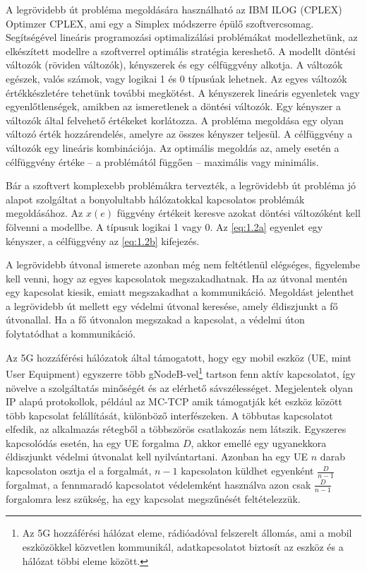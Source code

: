 \documentclass[a4paper,oneside]{article}
\begin{document}
A legrövidebb út probléma megoldására használható az IBM ILOG (CPLEX) Optimzer CPLEX,
ami egy a Simplex módszerre épülő szoftvercsomag.
Segítségével lineáris programozási optimalizálási \linebreak problémákat modellezhetünk,
az elkészített modellre a szoftverrel optimális stratégia kereshető.
A modellt döntési változók (röviden változók), kényszerek és egy célfüggvény alkotja.
A változók egészek, valós számok, vagy logikai 1 és 0 típusúak lehetnek.
Az egyes változók értékkészletére tehetünk további megkötést.
A kényszerek lineáris egyenletek vagy egyenlőtlenségek, amikben az ismeretlenek a döntési változók.
Egy kényszer a változók által felvehető értékeket korlátozza.
A probléma megoldása egy olyan változó érték hozzárendelés, amelyre az összes kényszer teljesül.
A célfüggvény a változók egy lineáris kombinációja.
Az optimális megoldás az, amely esetén a célfüggvény értéke
-- a problémától függően --  maximális vagy minimális.

Bár a szoftvert komplexebb problémákra tervezték, a legrövidebb út probléma jó
alapot szolgáltat a bonyolultabb hálózatokkal kapcsolatos problémák megoldásához.
Az $x(e)$ függvény értékeit keresve azokat döntési változóként kell fölvenni a modellbe.
A típusuk logikai 1 vagy 0.
Az \eqref{eq:1.2a} egyenlet egy kényszer, a célfüggvény az \eqref{eq:1.2b} kifejezés.

A legrövidebb útvonal ismerete azonban még nem feltétlenül elégséges,
figyelembe kell venni, hogy az egyes kapcsolatok megszakadhatnak.
Ha az útvonal mentén egy kapcsolat kiesik, emiatt megszakadhat a kommunikáció.
Megoldást jelenthet a legrövidebb út mellett egy védelmi útvonal keresése,
amely \linebreak éldiszjunkt a fő útvonallal.
Ha a fő útvonalon megszakad a kapcsolat, a védelmi úton folytatódhat a kommunikáció.

Az 5G hozzáférési hálózatok által támogatott, hogy egy mobil eszköz (UE, mint User Equipment)
egyszerre több gNodeB-vel\footnote{
  Az 5G hozzáférési hálózat eleme, rádióadóval felszerelt állomás, ami a mobil eszközökkel közvetlen kommunikál,
  adatkapcsolatot biztosít az eszköz és a hálózat többi eleme között.
  }
tartson fenn aktív kapcsolatot, így növelve a szolgáltatás minőségét és az elérhető sávszélességet. \cite{multiconnectivity}
Megjelentek olyan IP alapú protokollok, például az MC-TCP \cite{mptcp} amik \linebreak támogatják két eszköz között több kapcsolat felállítását, különböző interfészeken.
A többutas kapcsolatot elfedik, az alkalmazás rétegből a többszörös csatlakozás nem látszik.
Egyszeres kapcsolódás esetén, ha egy UE forgalma $D$, akkor emellé egy ugyanekkora éldiszjunkt védelmi útvonalat kell nyilvántartani.
Azonban ha egy UE $n$ darab kapcsolaton osztja el a forgalmát, $n - 1$ kapcsolaton küldhet egyenként $\frac{D}{n - 1}$ forgalmat, a
fennmaradó kapcsolatot védelemként használva azon csak $\frac{D}{n - 1}$ forgalomra lesz szükség, ha egy kapcsolat megszűnését feltételezzük.
\end{document}
